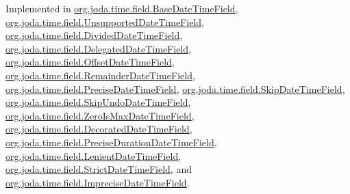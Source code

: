 Implemented in \hyperlink{classorg_1_1joda_1_1time_1_1field_1_1_base_date_time_field_ace20661fb97d7f15a921bcc8999aa1fc}{org.\-joda.\-time.\-field.\-Base\-Date\-Time\-Field}, \hyperlink{classorg_1_1joda_1_1time_1_1field_1_1_unsupported_date_time_field_a009efc3018a1abd63bc52984d37a0e8b}{org.\-joda.\-time.\-field.\-Unsupported\-Date\-Time\-Field}, \hyperlink{classorg_1_1joda_1_1time_1_1field_1_1_divided_date_time_field_ac0c45a41709ae12c4592a54d68eac4f6}{org.\-joda.\-time.\-field.\-Divided\-Date\-Time\-Field}, \hyperlink{classorg_1_1joda_1_1time_1_1field_1_1_delegated_date_time_field_ac8c71ae2bf565cc8ebcf71ddd4b4053f}{org.\-joda.\-time.\-field.\-Delegated\-Date\-Time\-Field}, \hyperlink{classorg_1_1joda_1_1time_1_1field_1_1_offset_date_time_field_afe8603c5a0bf138a712ee706ce3c25ac}{org.\-joda.\-time.\-field.\-Offset\-Date\-Time\-Field}, \hyperlink{classorg_1_1joda_1_1time_1_1field_1_1_remainder_date_time_field_ae850bdcf2a2682f30fea40eb87a8682e}{org.\-joda.\-time.\-field.\-Remainder\-Date\-Time\-Field}, \hyperlink{classorg_1_1joda_1_1time_1_1field_1_1_precise_date_time_field_ac6b9ef0c99c5980725f7b30ff1944bd3}{org.\-joda.\-time.\-field.\-Precise\-Date\-Time\-Field}, \hyperlink{classorg_1_1joda_1_1time_1_1field_1_1_skip_date_time_field_ae3c99a20cba5d0e5efba6fd798f4b6cd}{org.\-joda.\-time.\-field.\-Skip\-Date\-Time\-Field}, \hyperlink{classorg_1_1joda_1_1time_1_1field_1_1_skip_undo_date_time_field_ab349f12255fdf7f7d904066eb3267b7e}{org.\-joda.\-time.\-field.\-Skip\-Undo\-Date\-Time\-Field}, \hyperlink{classorg_1_1joda_1_1time_1_1field_1_1_zero_is_max_date_time_field_af04c39572f3c0c695b5238c5e62a2bd9}{org.\-joda.\-time.\-field.\-Zero\-Is\-Max\-Date\-Time\-Field}, \hyperlink{classorg_1_1joda_1_1time_1_1field_1_1_decorated_date_time_field_a2c48e6d5c609215a6b33049feb869f7a}{org.\-joda.\-time.\-field.\-Decorated\-Date\-Time\-Field}, \hyperlink{classorg_1_1joda_1_1time_1_1field_1_1_precise_duration_date_time_field_a63efdad90991a9b49b3bb51b0677f4d8}{org.\-joda.\-time.\-field.\-Precise\-Duration\-Date\-Time\-Field}, \hyperlink{classorg_1_1joda_1_1time_1_1field_1_1_lenient_date_time_field_a6fb7abba6bccf10aeee3f5e16705c91a}{org.\-joda.\-time.\-field.\-Lenient\-Date\-Time\-Field}, \hyperlink{classorg_1_1joda_1_1time_1_1field_1_1_strict_date_time_field_aa3b06664937c7804feb504305b9ae0e9}{org.\-joda.\-time.\-field.\-Strict\-Date\-Time\-Field}, and \hyperlink{classorg_1_1joda_1_1time_1_1field_1_1_imprecise_date_time_field_afbe1ae74dab8eb83f46b9c715742cb82}{org.\-joda.\-time.\-field.\-Imprecise\-Date\-Time\-Field}.

